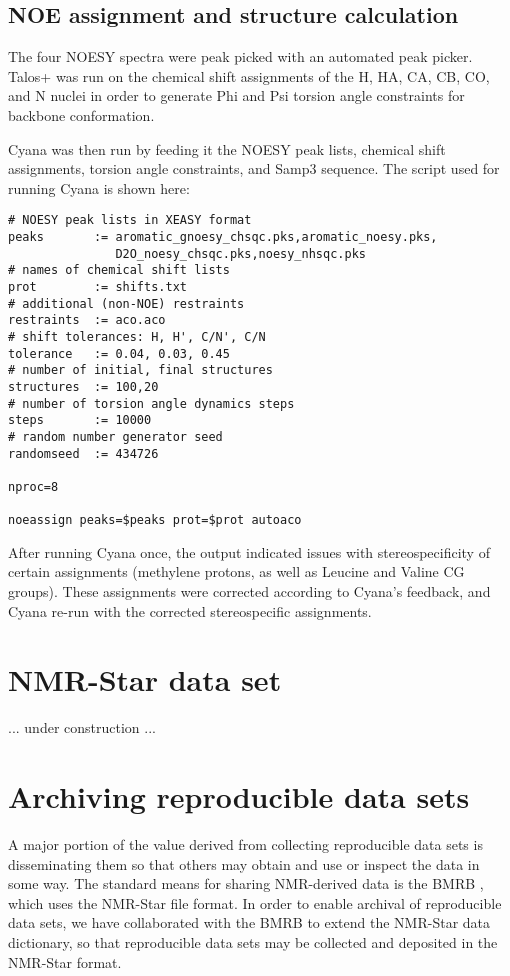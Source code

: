 \subsection{NOE assignment and structure calculation}
The four NOESY spectra were peak picked with an automated peak picker.  
Talos+ \cite{talos+} was run on the chemical shift assignments of the H, HA,
CA, CB, CO, and N nuclei in order to generate Phi and Psi torsion angle 
constraints for backbone conformation.

Cyana was then run by feeding it the NOESY peak lists, chemical shift
assignments, torsion angle constraints, and Samp3 sequence.  The script
used for running Cyana is shown here:
\begin{verbatim}
# NOESY peak lists in XEASY format
peaks       := aromatic_gnoesy_chsqc.pks,aromatic_noesy.pks,
               D2O_noesy_chsqc.pks,noesy_nhsqc.pks
# names of chemical shift lists
prot        := shifts.txt                
# additional (non-NOE) restraints
restraints  := aco.aco                   
# shift tolerances: H, H', C/N', C/N
tolerance   := 0.04, 0.03, 0.45          
# number of initial, final structures
structures  := 100,20                    
# number of torsion angle dynamics steps
steps       := 10000                    
# random number generator seed
randomseed  := 434726                    

nproc=8

noeassign peaks=$peaks prot=$prot autoaco
\end{verbatim}
After running Cyana once, the output indicated issues with stereospecificity
of certain assignments (methylene protons, as well as Leucine and Valine
CG groups).  These assignments were corrected according to Cyana's feedback,
and Cyana re-run with the corrected stereospecific assignments.


\section{NMR-Star data set}
... under construction ...


\section{Archiving reproducible data sets}
A major portion of the value derived from collecting reproducible data sets
is disseminating them so that others may obtain and use or inspect the data
in some way.  The standard means for sharing NMR-derived data is the BMRB
\cite{bmrb}, which uses the NMR-Star file format.  In order to enable archival
of reproducible data sets, we have collaborated with the BMRB to extend the
NMR-Star data dictionary, so that reproducible data sets may be collected and
deposited in the NMR-Star format.

